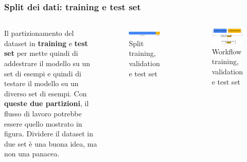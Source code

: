 \begin{frame}

	\frametitle{Split dei dati: training e test set}
	\begin{columns}
			Il partizionamento del dataset in \textbf{training} e \textbf{test set} per mette quindi di addestrare il modello su un set di esempi e quindi di testare il modello su un diverso set di esempi.
			\newlinedouble
			Con \textbf{queste due partizioni}, il flusso di lavoro potrebbe essere quello mostrato in figura.
			\newlinedouble
			Dividere il dataset in due set è una buona idea, ma non una panacea.

			\begin{figure}[!htbp]
				\centering
				\includegraphics[width=1.0\linewidth]{images/supervised/validation_test_splitting_data/Training_Test_1.pdf}
				\caption{Split training, validation e test set}
			\end{figure}

			\begin{figure}[!htbp]
				\centering
				\includegraphics[width=1.0\linewidth]{images/supervised/validation_test_splitting_data/Training_Test_2.pdf}
				\caption{Workflow training, validation e test set}
			\end{figure}

	\end{columns}
\end{frame}



